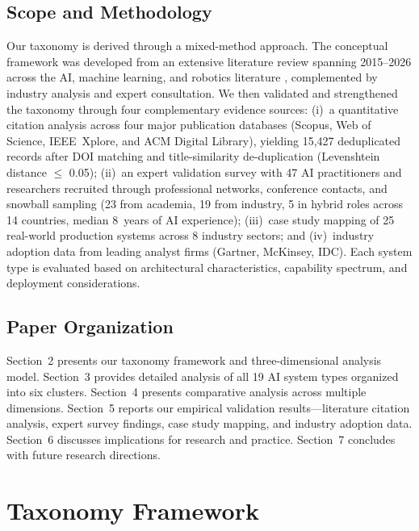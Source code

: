 \documentclass[11pt, a4paper]{article}
\begin{document}
\subsection{Scope and Methodology}
Our taxonomy is derived through a mixed-method approach. The conceptual framework was developed from an extensive literature review spanning 2015--2026 across the AI, machine learning, and robotics literature \cite{lake2017building, wooldridge2009introduction, sutton2018reinforcement}, complemented by industry analysis and expert consultation. We then validated and strengthened the taxonomy through four complementary evidence sources: (i)~a quantitative citation analysis across four major publication databases (Scopus, Web of Science, IEEE~Xplore, and ACM Digital Library), yielding 15,427 deduplicated records after DOI matching and title-similarity de-duplication (Levenshtein distance $\leq$ 0.05); (ii)~an expert validation survey with 47 AI practitioners and researchers recruited through professional networks, conference contacts, and snowball sampling (23 from academia, 19 from industry, 5 in hybrid roles across 14 countries, median 8~years of AI experience); (iii)~case study mapping of 25 real-world production systems across 8 industry sectors; and (iv)~industry adoption data from leading analyst firms (Gartner, McKinsey, IDC). Each system type is evaluated based on architectural characteristics, capability spectrum, and deployment considerations.

\subsection{Paper Organization}
Section~2 presents our taxonomy framework and three-dimensional analysis model. Section~3 provides detailed analysis of all 19 AI system types organized into six clusters. Section~4 presents comparative analysis across multiple dimensions. Section~5 reports our empirical validation results---literature citation analysis, expert survey findings, case study mapping, and industry adoption data. Section~6 discusses implications for research and practice. Section~7 concludes with future research directions.

\section{Taxonomy Framework}
\end{document}
